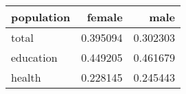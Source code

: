 \begin{tabular}{lrr}
\toprule
population &   female &     male \\
\midrule
     total & 0.395094 & 0.302303 \\
 education & 0.449205 & 0.461679 \\
    health & 0.228145 & 0.245443 \\
\bottomrule
\end{tabular}
